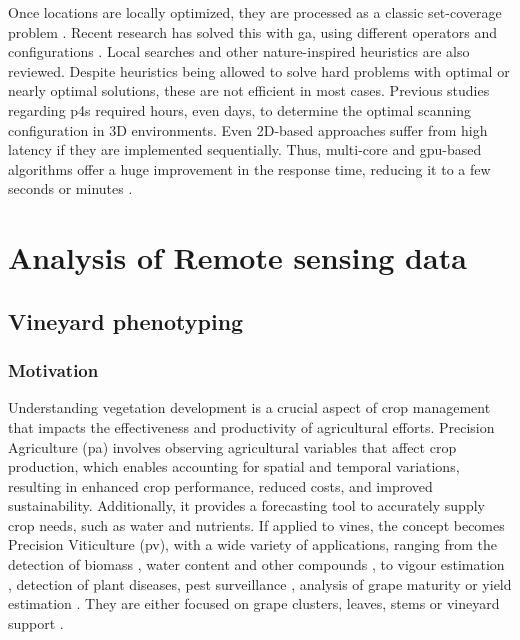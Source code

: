 Once locations are locally optimized, they are processed as a classic set-coverage problem \cite{soudarissanane_optimizing_2012}. Recent research has solved this with \acrshort{ga}, using different operators and configurations \cite{wang_solving_2018, roostapour_pareto_2022, mohamadi_efficient_2021}. Local searches \cite{li_probability_2021} and other nature-inspired heuristics \cite{islambouli_optimized_2019} are also reviewed. Despite heuristics being allowed to solve hard problems with optimal or nearly optimal solutions, these are not efficient in most cases. Previous studies regarding \acrshort{p4s} required hours, even days, to determine the optimal scanning configuration in 3D environments. Even 2D-based approaches suffer from high latency \cite{giorgini_sensor-based_2019} if they are implemented sequentially. Thus, multi-core and \acrshort{gpu}-based algorithms offer a huge improvement in the response time, reducing it to a few seconds or minutes \cite{giorgini_sensor-based_2019, wang_solving_2018, roberge_parallel_2021}. 

\section{Analysis of Remote sensing data}

\subsection{Vineyard phenotyping}

\subsubsection{Motivation}

Understanding vegetation development is a crucial aspect of crop management that impacts the effectiveness and productivity of agricultural efforts. Precision Agriculture (\acrshort{pa}) involves observing agricultural variables that affect crop production, which enables accounting for spatial and temporal variations, resulting in enhanced crop performance, reduced costs, and improved sustainability. Additionally, it provides a forecasting tool to accurately supply crop needs, such as water and nutrients. If applied to vines, the concept becomes Precision Viticulture (\acrshort{pv}), with a wide variety of applications, ranging from the detection of biomass \cite{di_gennaro_evaluation_2020}, water content \cite{santesteban_high-resolution_2017, gutierrez_assessing_2021} and other compounds \cite{peng_prediction_2022}, to vigour estimation \cite{bramley_12_2010, campos_development_2019}, detection of plant diseases, pest surveillance \cite{mendes_vineinspector_2022}, analysis of grape maturity \cite{soubry_monitoring_2017} or yield estimation \cite{hassanzadeh_broadacre_2021}. They are either focused on grape clusters, leaves, stems or vineyard support \cite{singh_bibliometric_2022}. 


